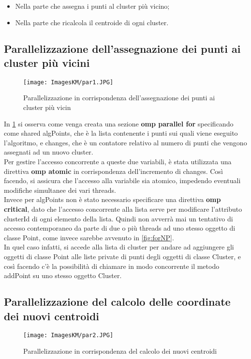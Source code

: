 \documentclass[10pt,twocolumn,letterpaper]{article}
\newcommand{\bit} {\begin{itemize} }
\newcommand{\eit} {\end{itemize} }
\begin{document}
\bit
    \item{Nella parte che assegna i punti al cluster più vicino;}
    \item{Nella parte che ricalcola il centroide di ogni cluster.}
\eit

\subsection{Parallelizzazione dell'assegnazione dei punti ai cluster più vicini}

\begin{figure}[h]
    \centering
    \texttt{[image: ImagesKM/par1.JPG]}
    \caption{Parallelizzazione in corrispondenza dell'assegnazione dei punti ai cluster più vicin}
    \label{fig:p1}
\end{figure}

In \cref{fig:p1} si osserva come venga creata una sezione \textbf{omp parallel for} specificando come shared algPoints, che è la lista contenente i punti sui quali viene eseguito l'algoritmo, e changes, che è un contatore relativo al numero di punti che vengono assegnati ad un nuovo cluster.\\
Per gestire l'accesso concorrente a queste due variabili, è stata utilizzata una direttiva \textbf{omp atomic} in corrispondenza dell'incremento di changes. Così facendo, si assicura che l'accesso alla variabile sia atomico, impedendo eventuali modifiche simultanee dei vari threads.\\
Invece per algPoints non è stato necessario specificare una direttiva \textbf{omp critical}, dato che l'accesso concorrente alla lista serve per modificare l'attributo clusterId di ogni elemento della lista. Quindi non avverrà mai un tentativo di accesso contemporaneo da parte di due o più threads ad uno stesso oggetto di classe Point, come invece sarebbe avvenuto in \cref{fig:forNP}.\\
In quel caso infatti, si accede alla lista di cluster per andare ad aggiungere gli oggetti di classe Point alle liste private di punti degli oggetti di classe Cluster, e così facendo c'è la possibilità di chiamare in modo concorrente il metodo addPoint su uno stesso oggetto Cluster.

\subsection{Parallelizzazione del calcolo delle coordinate dei nuovi centroidi}

\begin{figure}[h]
    \centering
    \texttt{[image: ImagesKM/par2.JPG]}
    \caption{Parallelizzazione in corrispondenza del calcolo dei nuovi centroidi}
    \label{fig:p2}
\end{figure}
\end{document}
